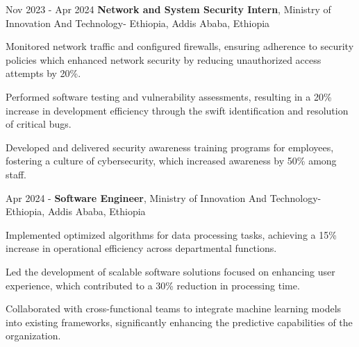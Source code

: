 \documentclass{modern} %
\begin{document}
    \begin{twocolentry}{
        Nov 2023 -  Apr 2024
    }
        \textbf{Network and System Security Intern}, Ministry of Innovation And Technology{-} Ethiopia, Addis Ababa, Ethiopia
    \end{twocolentry}

    \vspace{0.10cm}
    \begin{onecolentry}
        \begin{highlights}
                            \item Monitored network traffic and configured firewalls, ensuring adherence to security policies which enhanced network security by reducing unauthorized access attempts by 20\%. 
                            \item Performed software testing and vulnerability assessments, resulting in a 20\% increase in development efficiency through the swift identification and resolution of critical bugs. 
                            \item Developed and delivered security awareness training programs for employees, fostering a culture of cybersecurity, which increased awareness by 50\% among staff. 
                    \end{highlights}
    \end{onecolentry}

    \begin{twocolentry}{
        Apr 2024 -  
    }
        \textbf{Software Engineer}, Ministry of Innovation And Technology{-} Ethiopia, Addis Ababa, Ethiopia
    \end{twocolentry}

    \vspace{0.10cm}
    \begin{onecolentry}
        \begin{highlights}
                            \item Implemented optimized algorithms for data processing tasks, achieving a 15\% increase in operational efficiency across departmental functions. 
                            \item Led the development of scalable software solutions focused on enhancing user experience, which contributed to a 30\% reduction in processing time. 
                            \item Collaborated with cross{-}functional teams to integrate machine learning models into existing frameworks, significantly enhancing the predictive capabilities of the organization. 
                    \end{highlights}
    \end{onecolentry}
\end{document}
